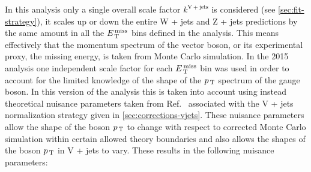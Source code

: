 In this analysis only a single overall scale factor $k^\mathrm{V + jets}$ is
considered (see \cref{sec:fit-strategy}), it scales up or down the entire W +
jets and Z + jets predictions by the same amount in all the $E_\mathrm{\, T}^\mathrm{\, miss}$ bins defined
in the analysis. This means effectively that the momentum spectrum of the vector
boson, or its experimental proxy, the missing energy, is taken from Monte Carlo
simulation. In the 2015 analysis one independent scale factor for each $E_\mathrm{\, T}^\mathrm{\, miss}$
bin was used in order to account for the limited knowledge of the shape of the
$p_\mathrm{\, T}$ spectrum of the gauge boson. In this version of the analysis this is taken
into account using instead theoretical nuisance parameters taken from
Ref.~\cite{VplusJetsCorrections} associated with the V + jets normalization
strategy given in \cref{sec:corrections-vjets}. These nuisance parameters allow
the shape of the boson $p_\mathrm{\, T}$ to change with respect to corrected Monte Carlo
simulation within certain allowed theory boundaries and also allows the shapes
of the boson $p_\mathrm{\, T}$ in V + jets to vary. These results in the following nuisance
parameters:
